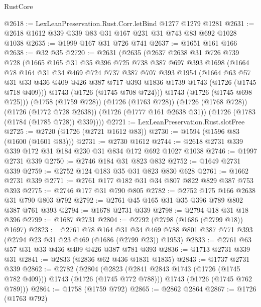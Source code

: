 \begin{lexlean}{RustCore}
\begin{coremodule}
@2618 := LexLeanPreservation.Rust.Corr.letBind @1277 @1279 @1281
@2631 := @2618 @1612 @339 @339 @83 @31 @167 @231 @31 @743 @83 @692 @1028 @1038
@2635 := @1999 @167 @31 @726 @741
@2637 := @1651 @161 @166
@2638 := @32 @35
@2720 := @2631
    (@2635
      (@2637
        @2638
        @31
        @726
        @739
        @728
        (@1665
          @165
          @31
          @35
          @396
          @725
          @738
          @387
          @697
          @393
          @1698
          (@1664
            @78
            @164
            @31
            @34
            @469
            @724
            @737
            @387
            @707
            @393
            @1954
            (@1664
              @63
              @57
              @31
              @33
              @436
              @409
              @426
              @387
              @717
              @393
              @1836
              @1739
              @1743
              (@1726 (@1745 @718 @409)))
            @1743
            (@1726 (@1745 @708 @724)))
          @1743
          (@1726 (@1745 @698 @725)))
        (@1758 (@1759 @728))
        (@1726 (@1763 @728))
        (@1726 (@1768 @728))
        (@1726 (@1772 @728 @2638))
        (@1726 (@1777 @161 @2638 @31))
        (@1726 (@1783 (@1784 (@1785 @728)) @339))))
@2721 := LexLeanPreservation.Rust.slotFree
@2725 := @2720 (@1726 (@2721 @1612 @83))
@2730 := @1594 (@1596 @83 (@1600 (@1601 @83)))
@2731 := @2730 @1612
@2744 := @2618 @2731 @339 @339 @172 @31 @184 @230 @31 @834 @172 @692 @1027 @1038
@2746 := @1997 @2731 @339
@2750 := @2746 @184 @31 @823 @832
@2752 := @1649 @2731 @339
@2759 := @2752 @124 @183 @35 @31 @823 @830 @628
@2761 := @1662 @2731 @339
@2771 := @2761 @177 @182 @31 @34 @807 @822 @829 @387 @753 @393
@2775 := @2746 @177 @31 @790 @805
@2782 := @2752 @175 @166 @2638 @31 @790 @803 @792
@2792 := @2761 @45 @165 @31 @35 @396 @789 @802 @387 @761 @393
@2794 := @1678 @2731 @339
@2798 := @2794 @18 @31 @18 @396
@2799 := @1687 @2731
@2804 := @2792 (@2798 (@1686 (@2799 @18)) @1697)
@2823 := @2761
    @78
    @164
    @31
    @34
    @469
    @788
    @801
    @387
    @771
    @393
    (@2794 @23 @31 @23 @469 (@1686 (@2799 @23)) @1953)
@2833 := @2761 @63 @57 @31 @33 @436 @409 @426 @387 @781 @393
@2836 := @1713 @2731 @339 @31
@2841 := @2833 (@2836 @62 @436 @1831 @1835)
@2843 := @1737 @2731 @339
@2862 := @2782
    (@2804
      (@2823 (@2841 @2843 @1743 (@1726 (@1745 @782 @409))) @1743 (@1726 (@1745 @772 @788)))
      @1743
      (@1726 (@1745 @762 @789)))
@2864 := @1758 (@1759 @792)
@2865 := @2862 @2864
@2867 := @1726 (@1763 @792)

\end{coremodule}
\end{lexlean}
